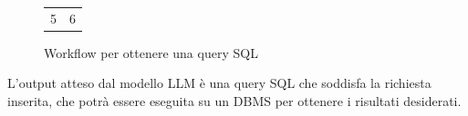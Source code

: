 \begin{figure}[H]
{\begin{tabular}{cc}
    5 & 6 \\[6pt]
  \end{tabular}}
  \caption{Workflow per ottenere una query SQL}
\end{figure}
\par L'output atteso dal modello LLM è una query SQL che soddisfa la richiesta inserita, che potrà essere eseguita su un DBMS per ottenere i risultati desiderati.